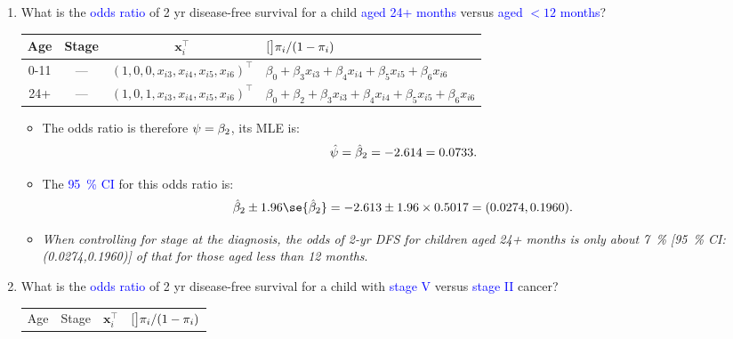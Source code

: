 \documentclass{article}\usepackage[]{graphicx}\usepackage[svgnames]{xcolor}
\let\exp\relax%
\let\log\relax%
\providecommand{\Vector}[1]{\bm{#1}}%
\begin{document}
\begin{enumerate}[label={Q\arabic*:}]
    \item What is the \textcolor{Blue}{odds ratio} of 2 yr disease-free survival for a child \textcolor{Blue}{aged 24+ months}
          versus \textcolor{Blue}{aged $<12$ months}?
          \begin{table}[!htbp]
              \centering
              \begin{tabular}{cccl}
                  Age  & Stage & $ \Vector{x}_i^\top $                        & $ \log[\big]{\pi_i/(1-\pi_i)} $                                            \\
                  \midrule
                  0-11 & ---   & $ (1,0,0,x_{i3},x_{i4},x_{i5},x_{i6})^\top $ & $ \beta_0+\beta_3x_{i3}+\beta_4x_{i4}+\beta_5x_{i5}+\beta_6x_{i6} $        \\
                  24+  & ---   & $ (1,0,1,x_{i3},x_{i4},x_{i5},x_{i6})^\top $ & $ \beta_0+\beta_2+\beta_3x_{i3}+\beta_4x_{i4}+\beta_5x_{i5}+\beta_6x_{i6}$ \\
                  \bottomrule
              \end{tabular}
          \end{table}
          \begin{itemize}
              \item The odds ratio is therefore $ \psi=\exp{\beta_2} $, its MLE is:
                    \[ \hat{\psi}=\exp{\hat{\beta}_2}=\exp{-2.614}=0.0733. \]
              \item The \textcolor{Blue}{\qty{95}{\percent} CI} for this odds ratio is:
                    \[ \exp{\hat{\beta}_2\pm 1.96\se{\hat{\beta}_2}}=\exp{-2.613\pm 1.96\times 0.5017}=(0.0274,0.1960). \]
              \item \emph{When controlling for stage at the diagnosis, the odds of 2-yr DFS for children aged 24+ months
                        is only about \qty{7}{\percent} [\qty{95}{\percent} CI\@: (0.0274,0.1960)] of that for those aged less than 12 months}.
          \end{itemize}
    \item What is the \textcolor{Blue}{odds ratio} of 2 yr disease-free survival for a child with
          \textcolor{Blue}{stage V} versus \textcolor{Blue}{stage II} cancer?
          \begin{table}[!htbp]
              \centering
              \begin{tabular}{cccl}
                  Age & Stage & $ \Vector{x}_i^\top $              & $ \log[\big]{\pi_i/(1-\pi_i)} $                 \\

\end{tabular}
\end{table}
\end{enumerate}
\end{document}
